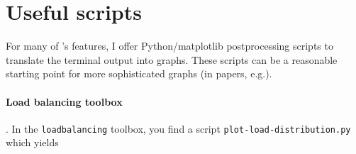 \section{Useful scripts}

For many of \Peano's features, I offer Python/matplotlib postprocessing scripts
to translate the terminal output into graphs.
These scripts can be a reasonable starting point for more sophisticated graphs
(in papers, e.g.).


\paragraph{Load balancing toolbox}.
In the \texttt{loadbalancing} toolbox, you find a script
\texttt{plot-load-distribution.py} which yields 

